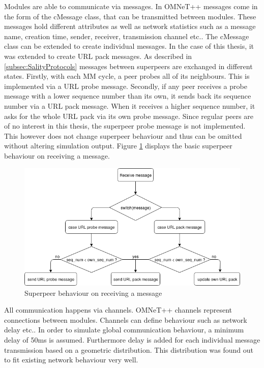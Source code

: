 \documentclass{article}
\begin{document}
Modules are able to communicate via messages. In OMNeT++ messages come in the form of the cMessage class, that can be transmitted between modules. These messages hold different attributes as well as network statistics such as a message name, creation time, sender, receiver, transmission channel etc.. The cMessage class can be extended to create individual messages. In the case of this thesis, it was extended to create URL pack messages. As described in \ref{subsec:SalityProtocols} messages between superpeers are exchanged in different states. Firstly, with each MM cycle, a peer probes all of its neighbours. This is implemented via a URL probe message. Secondly, if any peer receives a probe message with a lower sequence number than its own, it sends back its sequence number via a URL pack message. When it receives a higher sequence number, it asks for the whole URL pack via its own probe message. Since regular peers are of no interest in this thesis, the superpeer probe message is not implemented. This however does not change superpeer behaviour and thus can be omitted without altering simulation output. Figure \ref{fig:SalityMessageFlow} displays the basic superpeer behaviour on receiving a message. \\

\begin{figure}[H]
    \centering
    \includegraphics[width=\textwidth]{pictures/SalityMessageFlow.png}
    \caption{Superpeer behaviour on receiving a message}
    \label{fig:SalityMessageFlow}
\end{figure}

All communication happens via channels. OMNeT++ channels represent connections between modules. Channels can define behaviour such as network delay etc.. In order to simulate global communication behaviour, a minimum delay of 50ms is assumed. Furthermore delay is added for each individual message transmission based on a geometric distribution. This distribution was found out to fit existing network behaviour very well. \\
\end{document}
